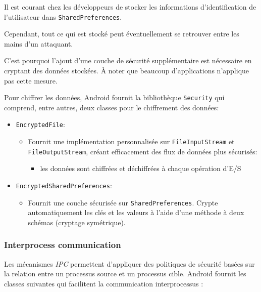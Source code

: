\documentclass[
  french,
  paper=a4,
  ,captions=tableheading
]{scrartcl}
\providecommand{\tightlist}{%
  \setlength{\itemsep}{0pt}\setlength{\parskip}{0pt}}
\begin{document}
Il est courant chez les développeurs de stocker les informations
d'identification de l'utilisateur dans \texttt{SharedPreferences}.

Cependant, tout ce qui est stocké peut éventuellement se retrouver entre
les mains d'un attaquant.

C'est pourquoi l'ajout d'une couche de sécurité supplémentaire est
nécessaire en cryptant des données stockées. 
À noter que beaucoup d'applications n'applique pas cette mesure.

Pour chiffrer les données, Android fournit la bibliothèque
\texttt{Security} qui comprend, entre autres, deux classes pour le
chiffrement des données:

\begin{itemize}
\tightlist
\item
  \texttt{EncryptedFile}:

  \begin{itemize}
  \tightlist
  \item
    Fournit une implémentation personnalisée sur
    \texttt{FileInputStream} et \texttt{FileOutputStream}, créant
    efficacement des flux de données plus sécurisés:

    \begin{itemize}
    \tightlist
    \item
      les données sont chiffrées et déchiffrées à chaque opération d'E/S
    \end{itemize}
  \end{itemize}
\item
  \texttt{EncryptedSharedPreferences}:

  \begin{itemize}
  \tightlist
  \item
    Fournit une couche sécurisée sur \texttt{SharedPreferences}. Crypte
    automatiquement les clés et les valeurs à l'aide d'une méthode à
    deux schémas (cryptage symétrique).
  \end{itemize}
\end{itemize}

\hypertarget{interprocess-communication}{%
\subsubsection{Interprocess
communication}\label{interprocess-communication}}

Les mécanismes \emph{IPC} permettent d'appliquer des politiques de
sécurité basées sur la relation entre un processus source et un
processus cible. Android fournit les classes suivantes qui facilitent la
communication interprocessus :
\end{document}
